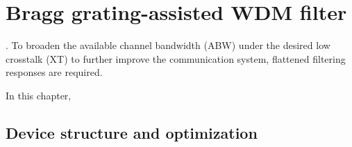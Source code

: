 
\chapter{Bragg grating-assisted WDM filter} \label{chap:4}
    \lipsum 
    \cite{cwdmf-mmi-3, cwdmf-mmi-1, cwdmf-wbg-1, cwdmf-awgmzi-1, cwdmf-awgmzi-2, cwdmf-awg-5, cwdmf-mzi-9, cwdmf-awg-4, cwdmf-awg-3, cwdmf-mmi-2, cwdmf-mzi-7, cwdmf-wbg-6-1, cwdmf-mzi-3, cwdmf-all, cwdmf-wbg-2, cwdmf-wbg-3, cwdmf-mzi-5, cwdmf-mzi-8, cwdmf-awg-1, cwdmf-wbg-6, cwdmf-eg-1, cwdmf-eg-2, cwdmf-mzi-2, cwdmf-mzi-6, cwdmf-mzi-1, cwdmf-mzi-4, cwdmf-wbg-4, cwdmf-awg-2, cwdmf-wbg-5}. 
    To broaden the available channel bandwidth (ABW) under the desired low crosstalk (XT) 
    to further improve the communication system, flattened filtering responses are required. 
    
    In this chapter, \lipsum

\section{Device structure and optimization} \label{sec:4.1}
    \lipsum
    
    \lipsum
    
    \lipsum
    
